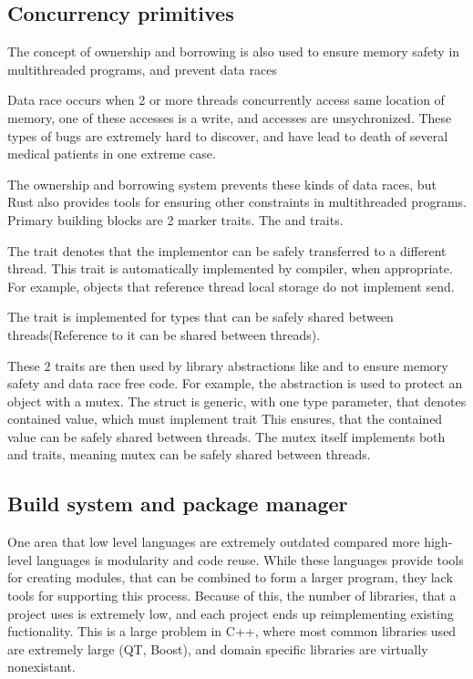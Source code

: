 \subsection{Concurrency primitives}
The concept of ownership and borrowing is also used to ensure memory safety in multithreaded programs, and prevent
data races

Data race occurs when 2 or more threads concurrently access same location of memory, one of these accesses is a write,
and accesses are unsychronized. These types of bugs are extremely hard to discover, and have lead to death of several medical patients in
one extreme case\cite{article:therac}.

The ownership and borrowing system prevents these kinds of data races, but Rust also provides tools for ensuring other
constraints in multithreaded programs. Primary building blocks are 2 marker traits. The  and  traits.

The  trait denotes that the implementor can be safely transferred to a different thread. This trait is automatically
implemented by compiler, when appropriate. For example, objects that reference thread local storage do not implement send.

The  trait is implemented for types that can be safely shared between threads(Reference to it can be shared between threads).

These 2 traits are then used by library abstractions like  and  to ensure memory safety and data race free code.
For example, the  abstraction is used to protect an object with a mutex. The  struct is generic,
with one type parameter, that denotes contained value, which must implement  trait
This ensures, that the contained value can be safely shared between threads. The mutex itself implements both  and  traits,
meaning mutex can be safely shared between threads.

\subsection{Build system and package manager}
One area that low level languages are extremely outdated compared more high-level languages is modularity and code reuse.
While these languages provide tools for creating modules, that can be combined to form a larger program, they lack tools
for supporting this process. Because of this, the number of libraries, that a project uses is extremely low, and
each project ends up reimplementing existing fuctionality. This is a large problem in C++, where most common
libraries used are extremely large (QT, Boost), and domain specific libraries are virtually nonexistant.

